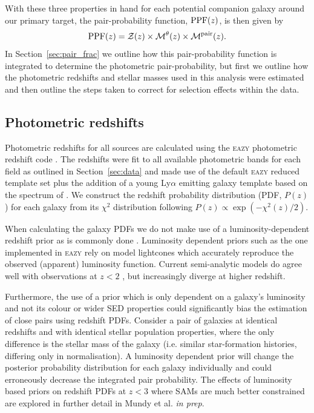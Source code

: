 With these three properties in hand for each potential companion galaxy around our primary target, the pair-probability function, $\textup{PPF}(z)$, is then given by
\begin{equation}\label{eq:PPF}
\textup{PPF}(z) = \mathcal{Z}(z) \times \mathcal{M}^{\theta}(z) \times \mathcal{M}^{\text{pair}}(z).
\end{equation}
In Section~\ref{sec:pair_frac} we outline how this pair-probability function is integrated to determine the photometric pair-probability, but first we outline how the photometric redshifts and stellar masses used in this analysis were estimated and then outline the steps taken to correct for selection effects within the data.

\subsection{Photometric redshifts}\label{sec:photoz}
Photometric redshifts for all sources are calculated using the \textsc{eazy} photometric redshift code \citep{Brammer:2008gn}. The redshifts were fit to all available photometric bands for each field as outlined in Section~\ref{sec:data} and made use of the default \textsc{eazy} reduced template set plus the addition of a young Ly$\alpha$ emitting galaxy template based on the spectrum of \citet{2010ApJ...719.1168E}. We construct the redshift probability distribution (PDF, $P(z)$) for each galaxy from its $\chi^{2}$ distribution following $P(z) \propto \exp(-\chi^{2}(z)/2)$.

When calculating the galaxy PDFs we do not make use of a luminosity-dependent redshift prior as is commonly done \citep{Brammer:2008gn,Dahlen:2013eu}. Luminosity dependent priors such as the one implemented in \textsc{eazy} rely on model lightcones which accurately reproduce the observed (apparent) luminosity function. Current semi-analytic models do agree well with observations at $z < 2$ \citep{Henriques:2012gsa}, but increasingly diverge at higher redshift.

Furthermore, the use of a prior which is only dependent on a galaxy's luminosity and not its colour or wider SED properties could significantly bias the estimation of close pairs using redshift PDFs. Consider a pair of galaxies at identical redshifts and with identical stellar population properties, where the only difference is the stellar mass of the galaxy (i.e. similar star-formation histories, differing only in normalisation). A luminosity dependent prior will change the posterior probability distribution for each galaxy individually and could erroneously decrease the integrated pair probability. The effects of luminosity based priors on redshift PDFs at $z < 3$ where SAMs are much better constrained are explored in further detail in Mundy et al. \emph{in prep}.

